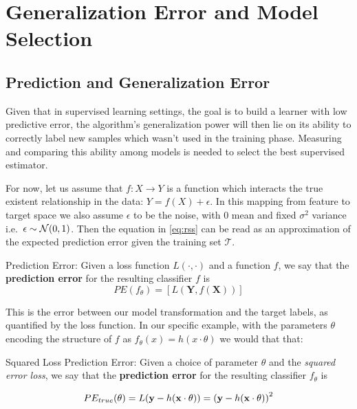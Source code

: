 
\chapter{Generalization Error and Model Selection }\label{cha:modelSelection}



\section{Prediction and Generalization Error}\label{subsection-generalizationError}

Given that in supervised learning settings, the goal is to build a learner with low predictive error, the algorithm's generalization power will then lie on its ability to correctly label new samples which wasn't used in the training phase. Measuring and comparing this ability among models is needed to select the best supervised estimator.

For now, let us assume that $f: X \rightarrow Y$ is a function which interacts the true existent relationship in the data: $Y = f(X) + \epsilon$. In this mapping from feature to target space we also assume $\epsilon$ to be the noise, with $0$ mean and fixed $\sigma^2$ variance i.e.\ $\epsilon \sim \operatorname{\mathcal{N}}(0,1) $. Then the equation in \cref{eq:rss} can be read as an approximation of the expected prediction error given the training set $\mathcal{T}$.


\begin{definition}{Prediction Error:}
	Given a loss function $L(\cdot,\cdot)$ and a function $f$, we say that the \textbf{prediction error} for the resulting classifier $f$ is
	\[
	PE(f_\theta)= \left[ L(\textbf{Y},f(\textbf{X}))\right]
	\]
\end{definition}

This is the error between our model transformation and the target labels, as quantified by the loss function.  In our specific example, with the parameters $\theta$ encoding the structure of $f$ as $f_\theta(x) = h(x \cdot \theta)$ we would that that:

\begin{definition}{Squared Loss Prediction Error:}
	Given a choice of parameter $\theta$ and the \textit{squared error loss}, we say that the \textbf{prediction error} for the resulting classifier $f_\theta$ is

	\begin{equation}
	PE_{true}(\theta) =L(\textbf{y} - h(\textbf{x} \cdot \theta) )  \\
	=  {(\textbf{y} - h(\textbf{x} \cdot \theta) )}^2
	\end{equation}

\end{definition}

